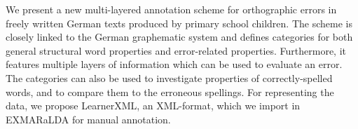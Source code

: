 We present a new multi-layered annotation scheme for orthographic errors in freely written German texts produced by primary school children. The scheme is closely linked to the German graphematic system and defines categories for both general structural word properties and error-related properties. Furthermore, it features multiple layers of information which can be used to evaluate an error. The categories can also be used to investigate properties of correctly-spelled words, and to compare them to the erroneous spellings. For representing the data, we propose LearnerXML, an XML-format, which we import in EXMARaLDA for manual annotation.

